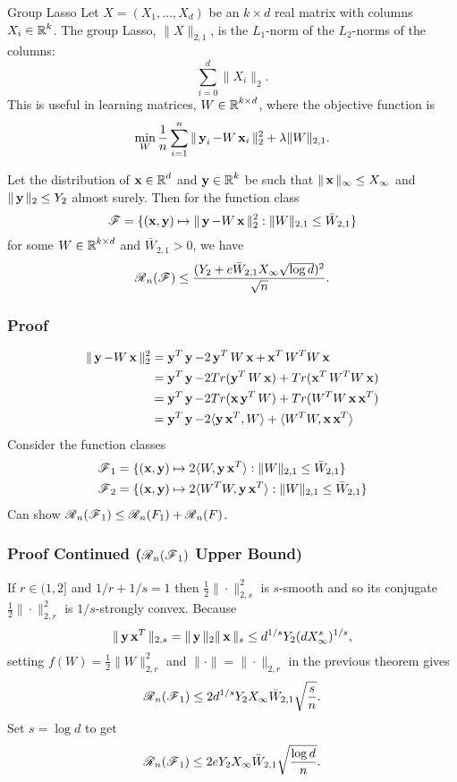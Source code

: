 

\begin{frame}{Group Lasso}
Let  $X = (X_1, \dots, X_d)$ be an $k \times d$ real matrix with columns
$X_i \in \R^k$. The group Lasso, $\|X\|_{2,1}$, is the $L_1$-norm of the $L_2$-norms of
the columns:
\[\sum_{i = 0}^d \|X_i\|_2.\]
This is useful in learning matrices, $W \in \R^{k \times d}$, where the objective function is
\[ \min_W \frac{1}{n} \sum_{i=1}^n \|\y_i - W\x_i\|_2^2 + \lambda \|W\|_{2,1}.\]
\end{frame}


\begin{frame}
\begin{theorem}
Let the distribution of $\x \in \R^d$ and $\y \in \R^k$ be such that
$\|\x\|_\infty \le X_\infty$ and $\|\y\|_2 \le Y_2$ almost surely.
Then for the function class
\[\F = \{(\x, \y) \mapsto \|\y - W\x\|_2^2 : \|W\|_{2,1} \le \bar{W}_{2,1}\}\]
for some $W \in \R^{k \times d}$ and $\bar{W}_{2,1} > 0$, we have
\[\Rad_n(\F) \le \frac{(Y_2 + e\bar{W}_{2,1} X_\infty \sqrt{\log d})^2}{\sqrt{n}}.\]
\end{theorem}
\end{frame}


\begin{frame}
\frametitle{Proof}
\begin{align*}
\|\y - W\x\|_2^2 &= \y^T \y - 2 \y^T W \x + \x^T W^T W \x \\
   &= \y^T \y - 2 Tr(\y^T W \x) + Tr(\x^T W^T W \x) \\
   &= \y^T \y - 2 Tr(\x \y^T W) + Tr(W^T W \x \x^T) \\
   &= \y^T \y - 2\langle \y \x^T, W\rangle + \langle W^TW, \x \x^T\rangle
\end{align*}
Consider the function classes
\begin{align*}
\F_1 &= \{(\x, \y) \mapsto 2\langle W, \y\x^T\rangle : \|W\|_{2,1} \le \bar{W}_{2,1}\} \\
\F_2 &= \{(\x, \y) \mapsto 2\langle W^T W, \y\x^T\rangle : \|W\|_{2,1} \le \bar{W}_{2,1}\}
\end{align*}
Can show $\Rad_n(\F_1) \le \Rad_n(F_1) + \Rad_n(F)$.
\end{frame}


\begin{frame}
\frametitle{Proof Continued ($\Rad_n(\F_1)$ Upper Bound)}
If $r \in (1,2]$ and $1/r + 1/s = 1$ then $\frac{1}{2} \| \cdot \|_{2,s}^2$ is $s$-smooth and so
its conjugate $\frac{1}{2}\| \cdot \|_{2,r}^2$ is $1/s$-strongly convex. 
Because 
\[\|\y \x^T\|_{2,s} = \|\y\|_2 \|\x\|_s \le d^{1/s} Y_2 (dX_\infty^s)^{1/s},\] 
setting $f(W) = \frac{1}{2}\|W\|_{2,r}^2$ and $\| \cdot \| = \| \cdot \|_{2,r}$ in 
the previous theorem gives
\[\Rad_n(\F_1) \le 2d^{1/s}Y_2X_\infty \bar{W}_{2,1}\sqrt{\frac{s}{n}}.\]
Set $s = \log d$ to get
\[\Rad_n(\F_1) \le 2eY_2X_\infty \bar{W}_{2,1}\sqrt{\frac{\log d}{n}}.\]
\end{frame}


